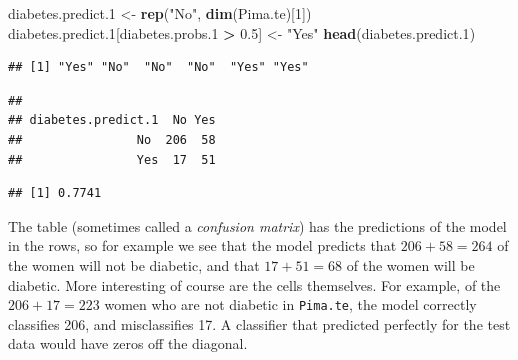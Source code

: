 \documentclass[
]{krantz}
\newenvironment{Shaded}{\begin{snugshade}}{\end{snugshade}}
\newcommand{\DecValTok}[1]{\textcolor[rgb]{0.00,0.00,0.81}{#1}}
\newcommand{\FloatTok}[1]{\textcolor[rgb]{0.00,0.00,0.81}{#1}}
\newcommand{\KeywordTok}[1]{\textcolor[rgb]{0.13,0.29,0.53}{\textbf{#1}}}
\newcommand{\NormalTok}[1]{#1}
\newcommand{\OperatorTok}[1]{\textcolor[rgb]{0.81,0.36,0.00}{\textbf{#1}}}
\newcommand{\StringTok}[1]{\textcolor[rgb]{0.31,0.60,0.02}{#1}}
\begin{document}
\begin{Shaded}
\begin{Highlighting}[]
\NormalTok{diabetes.predict}\FloatTok{.1}\NormalTok{ \textless{}{-}}\StringTok{ }\KeywordTok{rep}\NormalTok{(}\StringTok{"No"}\NormalTok{, }\KeywordTok{dim}\NormalTok{(Pima.te)[}\DecValTok{1}\NormalTok{])}
\NormalTok{diabetes.predict}\FloatTok{.1}\NormalTok{[diabetes.probs}\FloatTok{.1} \OperatorTok{\textgreater{}}\StringTok{ }\FloatTok{0.5}\NormalTok{] \textless{}{-}}\StringTok{ "Yes"}
\KeywordTok{head}\NormalTok{(diabetes.predict}\FloatTok{.1}\NormalTok{)}
\end{Highlighting}
\end{Shaded}

\begin{verbatim}
## [1] "Yes" "No"  "No"  "No"  "Yes" "Yes"
\end{verbatim}

\begin{Shaded}
\end{Shaded}

\begin{verbatim}
##                   
## diabetes.predict.1  No Yes
##                No  206  58
##                Yes  17  51
\end{verbatim}

\begin{Shaded}
\end{Shaded}

\begin{verbatim}
## [1] 0.7741
\end{verbatim}

The table (sometimes called a \emph{confusion matrix}) has the predictions of the model in the rows, so for example we see that the model predicts that \(206 + 58 = 264\) of the women will not be diabetic, and that \(17+51 = 68\) of the women will be diabetic. More interesting of course are the cells themselves. For example, of the \(206 + 17 = 223\) women who are not diabetic in \texttt{Pima.te}, the model correctly classifies 206, and misclassifies 17. A classifier that predicted perfectly for the test data would have zeros off the diagonal.
\end{document}
